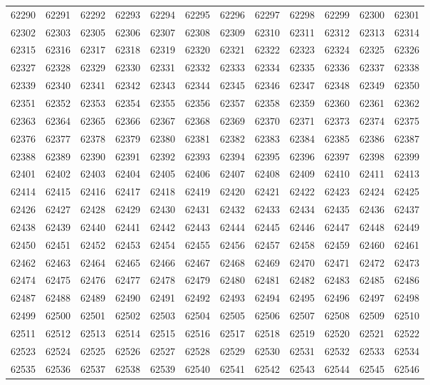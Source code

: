 \begin{center}
\begin{longtable}{llllllllllll}
62290 &62291 &62292 &62293 &62294 &62295 &62296 &62297 &62298 &62299 &62300 &62301 \\
62302 &62303 &62305 &62306 &62307 &62308 &62309 &62310 &62311 &62312 &62313 &62314 \\
62315 &62316 &62317 &62318 &62319 &62320 &62321 &62322 &62323 &62324 &62325 &62326 \\
62327 &62328 &62329 &62330 &62331 &62332 &62333 &62334 &62335 &62336 &62337 &62338 \\
62339 &62340 &62341 &62342 &62343 &62344 &62345 &62346 &62347 &62348 &62349 &62350 \\
62351 &62352 &62353 &62354 &62355 &62356 &62357 &62358 &62359 &62360 &62361 &62362 \\
62363 &62364 &62365 &62366 &62367 &62368 &62369 &62370 &62371 &62373 &62374 &62375 \\
62376 &62377 &62378 &62379 &62380 &62381 &62382 &62383 &62384 &62385 &62386 &62387 \\
62388 &62389 &62390 &62391 &62392 &62393 &62394 &62395 &62396 &62397 &62398 &62399 \\
62401 &62402 &62403 &62404 &62405 &62406 &62407 &62408 &62409 &62410 &62411 &62413 \\
62414 &62415 &62416 &62417 &62418 &62419 &62420 &62421 &62422 &62423 &62424 &62425 \\
62426 &62427 &62428 &62429 &62430 &62431 &62432 &62433 &62434 &62435 &62436 &62437 \\
62438 &62439 &62440 &62441 &62442 &62443 &62444 &62445 &62446 &62447 &62448 &62449 \\
62450 &62451 &62452 &62453 &62454 &62455 &62456 &62457 &62458 &62459 &62460 &62461 \\
62462 &62463 &62464 &62465 &62466 &62467 &62468 &62469 &62470 &62471 &62472 &62473 \\
62474 &62475 &62476 &62477 &62478 &62479 &62480 &62481 &62482 &62483 &62485 &62486 \\
62487 &62488 &62489 &62490 &62491 &62492 &62493 &62494 &62495 &62496 &62497 &62498 \\
62499 &62500 &62501 &62502 &62503 &62504 &62505 &62506 &62507 &62508 &62509 &62510 \\
62511 &62512 &62513 &62514 &62515 &62516 &62517 &62518 &62519 &62520 &62521 &62522 \\
62523 &62524 &62525 &62526 &62527 &62528 &62529 &62530 &62531 &62532 &62533 &62534 \\
62535 &62536 &62537 &62538 &62539 &62540 &62541 &62542 &62543 &62544 &62545 &62546 \\

\end{longtable}
\end{center}

